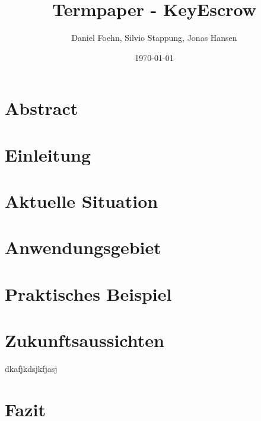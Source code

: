 \documentclass[a4paper, 10pt, fleqn]{article}
\title{Termpaper - KeyEscrow}
\author{Daniel Foehn, Silvio Stappung, Jonas Hansen}
\date{\today} %
\begin{document}
\maketitle
\tableofcontents
\listoffigures
\listoftables
\clearpage
\section{Abstract}

\clearpage
\section{Einleitung}

\clearpage
\section{Aktuelle Situation}
	

\clearpage
\section{Anwendungsgebiet}
	

\clearpage
\section{Praktisches Beispiel}
	 

\clearpage
\section{Zukunftsaussichten}
dkafjkdsjkfjasj \cite[p. 415]{ndgesetz}

\clearpage
\section{Fazit}

\nocite{*}
\clearpage


\end{document}
